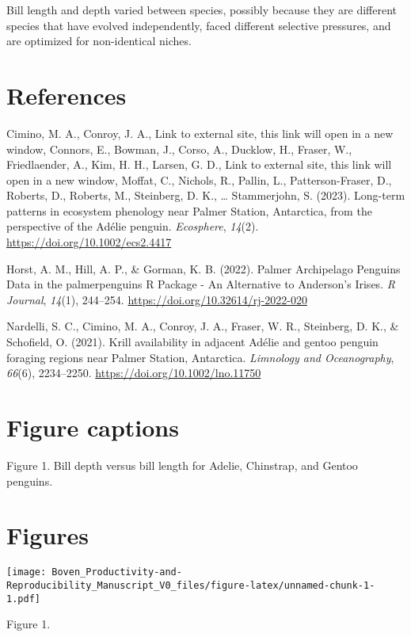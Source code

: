 \documentclass[
]{article}
\newlength{\cslhangindent}
\newlength{\cslentryspacingunit} %
\newenvironment{CSLReferences}[2] %
 {%
  \setlength{\parindent}{0pt}
  \ifodd #1
  \let\oldpar\par
  \def\par{\hangindent=\cslhangindent\oldpar}
  \fi
  \setlength{\parskip}{#2\cslentryspacingunit}
 }%
 {}
\begin{document}
Bill length and depth varied between species, possibly because they are
different species that have evolved independently, faced different
selective pressures, and are optimized for non-identical niches.

\newpage

\hypertarget{references}{%
\section{References}\label{references}}

\hypertarget{refs}{}
\begin{CSLReferences}{1}{0}
\leavevmode{}%
Cimino, M. A., Conroy, J. A., Link to external site, this link will open
in a new window, Connors, E., Bowman, J., Corso, A., Ducklow, H.,
Fraser, W., Friedlaender, A., Kim, H. H., Larsen, G. D., Link to
external site, this link will open in a new window, Moffat, C., Nichols,
R., Pallin, L., Patterson-Fraser, D., Roberts, D., Roberts, M.,
Steinberg, D. K., \ldots{} Stammerjohn, S. (2023). Long-term patterns in
ecosystem phenology near {Palmer Station}, {Antarctica}, from the
perspective of the {Adélie} penguin. \emph{Ecosphere}, \emph{14}(2).
\url{https://doi.org/10.1002/ecs2.4417}

\leavevmode{}%
Horst, A. M., Hill, A. P., \& Gorman, K. B. (2022). Palmer {Archipelago
Penguins Data} in the palmerpenguins {R Package} - {An Alternative} to
{Anderson}'s {Irises}. \emph{R Journal}, \emph{14}(1), 244--254.
\url{https://doi.org/10.32614/rj-2022-020}

\leavevmode{}%
Nardelli, S. C., Cimino, M. A., Conroy, J. A., Fraser, W. R., Steinberg,
D. K., \& Schofield, O. (2021). Krill availability in adjacent {Adélie}
and gentoo penguin foraging regions near {Palmer Station}, {Antarctica}.
\emph{Limnology and Oceanography}, \emph{66}(6), 2234--2250.
\url{https://doi.org/10.1002/lno.11750}

\end{CSLReferences}

\newpage

\hypertarget{figure-captions}{%
\section{Figure captions}\label{figure-captions}}

Figure 1. Bill depth versus bill length for Adelie, Chinstrap, and
Gentoo penguins.

\hypertarget{figures}{%
\section{Figures}\label{figures}}

\texttt{[image: Boven\_Productivity-and-Reproducibility\_Manuscript\_V0\_files/figure-latex/unnamed-chunk-1-1.pdf]}

Figure 1.
\end{document}
